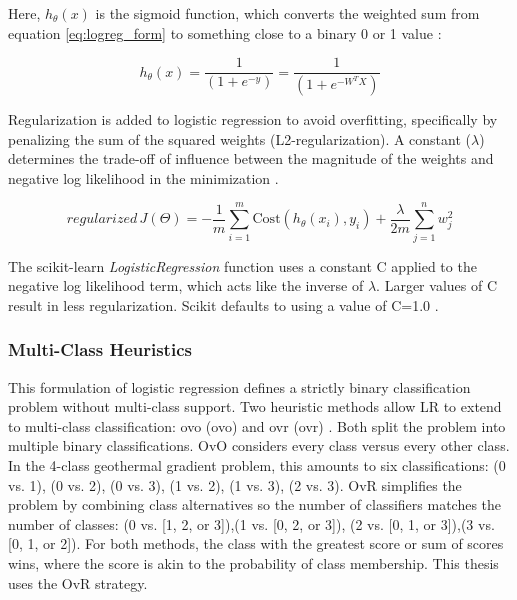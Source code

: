 Here, $h_{\theta}(x)$ is the sigmoid function, which converts the weighted sum from equation \ref{eq:logreg_form} to something close to a binary 0 or 1 value \citep[p. 369]{bertsimas_analytics_2016}:

\begin{equation}
\label{eq:sigmoid}
h_{\theta}(x) = \frac{1}{(1+e^{-y})} = \frac{1}{(1+e^{-W^TX})}
\end{equation}

Regularization is added to logistic regression to avoid overfitting, specifically by penalizing the sum of the squared weights (L2-regularization). A constant ($\lambda$) determines the trade-off of influence between the magnitude of the weights and negative log likelihood in the minimization \citep{ng_regularization_2011}.

\begin{equation}
    regularized\,J(\Theta) = -\frac{1}{m}\sum_{i=1}^{m}{\text{Cost}(h_{\theta}(x_i),y_i) + \frac{\lambda}{2m}\sum_{j=1}^{n}{w_j^2}}
\end{equation}

The scikit-learn \textit{LogisticRegression} function uses a constant C applied to the negative log likelihood term, which acts like the inverse of $\lambda$. Larger values of C result in less regularization. Scikit defaults to using a value of C=1.0 \citep{scikit-learn_1111_2021}.

\subsubsection{Multi-Class Heuristics} \label{ch5:multi_log_reg}

This formulation of logistic regression defines a strictly binary classification problem without multi-class support. Two heuristic methods allow LR to extend to multi-class classification: \acrlong{ovo} (\acrshort{ovo}) and \acrlong{ovr} (\acrshort{ovr}) \citep{brownlee_one-vs-rest_2020,scikit-learn_multiclass_2021}. Both split the problem into multiple binary classifications. OvO considers every class versus every other class. In the 4-class geothermal gradient problem, this amounts to six classifications: {(0 vs. 1), (0 vs. 2), (0 vs. 3), (1 vs. 2), (1 vs. 3), (2 vs. 3)}. OvR simplifies the problem by combining class alternatives so the number of classifiers matches the number of classes: {(0 vs. [1, 2, or 3]),(1 vs. [0, 2, or 3]), (2 vs. [0, 1, or 3]),(3 vs. [0, 1, or 2])}. For both methods, the class with the greatest score or sum of scores wins, where the score is akin to the probability of class membership. This thesis uses the OvR strategy.

